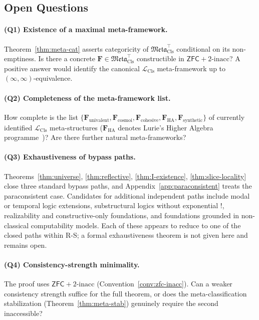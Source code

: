 \documentclass[11pt]{article}
\theoremstyle{plain}
\theoremstyle{definition}
\newcommand{\Meta}{\mathfrak{Meta}}
\newcommand{\LCls}{\mathcal{L}_{\mathrm{Cls}}}
\newcommand{\ZFC}{\mathsf{ZFC}}
\begin{document}
\subsection{Open Questions}

\paragraph{(Q1) Existence of a maximal meta-framework.} Theorem~\ref{thm:meta-cat} asserts categoricity of $\Meta_{\mathrm{Cls}}^{\top}$ conditional on its non-emptiness. Is there a concrete $\mathbf{F} \in \Meta_{\mathrm{Cls}}^{\top}$ constructible in $\ZFC + 2\text{-inacc}$? A positive answer would identify the canonical $\LCls$ meta-framework up to $(\infty, \infty)$-equivalence.

\paragraph{(Q2) Completeness of the meta-framework list.} How complete is the list $\{\mathbf{F}_{\mathrm{univalent}},\allowbreak \mathbf{F}_{\mathrm{cosmoi}},\allowbreak \mathbf{F}_{\mathrm{cohesive}},\allowbreak \mathbf{F}_{\mathrm{HA}},\allowbreak \mathbf{F}_{\mathrm{synthetic}}\}$ of currently identified $\LCls$ meta-structures ($\mathbf{F}_{\mathrm{HA}}$ denotes Lurie's Higher Algebra programme~\cite{LurieHA})? Are there further natural meta-frameworks?

\paragraph{(Q3) Exhaustiveness of bypass paths.} Theorems~\ref{thm:universe}, \ref{thm:reflective}, \ref{thm:I-existence}, \ref{thm:slice-locality} close three standard bypass paths, and Appendix~\ref{app:paraconsistent} treats the paraconsistent case. Candidates for additional independent paths include modal or temporal logic extensions, substructural logics without exponential $!$, realizability and constructive-only foundations, and foundations grounded in non-classical computability models. Each of these appears to reduce to one of the closed paths within R-S; a formal exhaustiveness theorem is not given here and remains open.

\paragraph{(Q4) Consistency-strength minimality.} The proof uses $\ZFC + 2\text{-inacc}$ (Convention~\ref{conv:zfc-inacc}). Can a weaker consistency strength suffice for the full theorem, or does the meta-classification stabilization (Theorem~\ref{thm:meta-stab}) genuinely require the second inaccessible?
\end{document}
